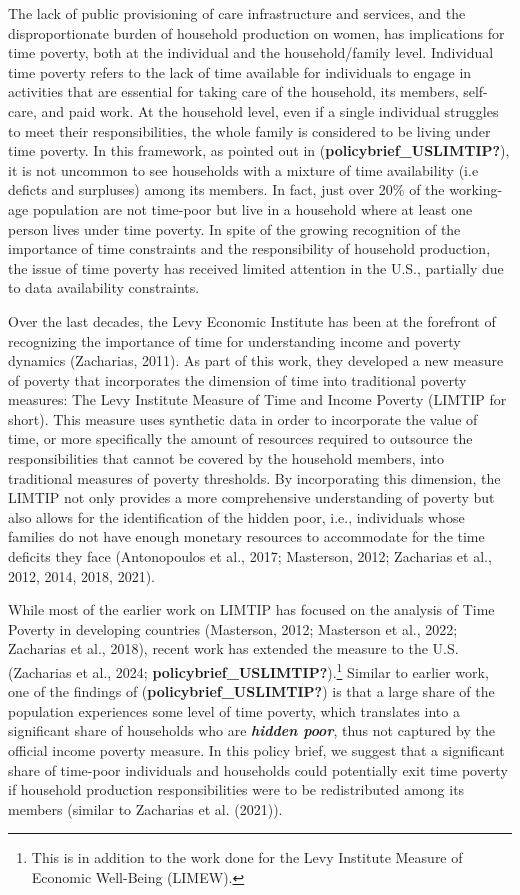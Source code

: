\documentclass[
  11pt,
]{article}
\begin{document}
The lack of public provisioning of care infrastructure and services, and
the disproportionate burden of household production on women, has
implications for time poverty, both at the individual and the
household/family level. Individual time poverty refers to the lack of
time available for individuals to engage in activities that are
essential for taking care of the household, its members, self-care, and
paid work. At the household level, even if a single individual struggles
to meet their responsibilities, the whole family is considered to be
living under time poverty. In this framework, as pointed out in
(\textbf{policybrief\_USLIMTIP?}), it is not uncommon to see households
with a mixture of time availability (i.e deficts and surpluses) among
its members. In fact, just over 20\% of the working-age population are
not time-poor but live in a household where at least one person lives
under time poverty. In spite of the growing recognition of the
importance of time constraints and the responsibility of household
production, the issue of time poverty has received limited attention in
the U.S., partially due to data availability constraints.

Over the last decades, the Levy Economic Institute has been at the
forefront of recognizing the importance of time for understanding income
and poverty dynamics (Zacharias, 2011). As part of this work, they
developed a new measure of poverty that incorporates the dimension of
time into traditional poverty measures: The Levy Institute Measure of
Time and Income Poverty (LIMTIP for short). This measure uses synthetic
data in order to incorporate the value of time, or more specifically the
amount of resources required to outsource the responsibilities that
cannot be covered by the household members, into traditional measures of
poverty thresholds. By incorporating this dimension, the LIMTIP not only
provides a more comprehensive understanding of poverty but also allows
for the identification of the hidden poor, i.e., individuals whose
families do not have enough monetary resources to accommodate for the
time deficits they face (Antonopoulos et al., 2017; Masterson, 2012;
Zacharias et al., 2012, 2014, 2018, 2021).

While most of the earlier work on LIMTIP has focused on the analysis of
Time Poverty in developing countries (Masterson, 2012; Masterson et al.,
2022; Zacharias et al., 2018), recent work has extended the measure to
the U.S. (Zacharias et al., 2024;
\textbf{policybrief\_USLIMTIP?}).\footnote{This is in addition to the
  work done for the Levy Institute Measure of Economic Well-Being
  (LIMEW).} Similar to earlier work, one of the findings of
(\textbf{policybrief\_USLIMTIP?}) is that a large share of the
population experiences some level of time poverty, which translates into
a significant share of households who are \textbf{\emph{hidden poor}},
thus not captured by the official income poverty measure. In this policy
brief, we suggest that a significant share of time-poor individuals and
households could potentially exit time poverty if household production
responsibilities were to be redistributed among its members (similar to
Zacharias et al. (2021)).
\end{document}
